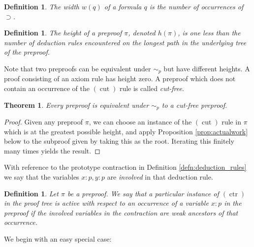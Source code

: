 \documentclass[english,letter paper,12pt,leqno]{article}
\newtheorem{thm}[theorem]{Theorem}
\theoremstyle{example}
\newtheorem{definition}[theorem]{Definition}
\numberwithin{equation}{section}
\def\imp{\supset}
\begin{document}
\begin{definition}
The \emph{width} $w(q)$ of a formula $q$ is the number of occurrences of $\imp$.
\end{definition}

\begin{definition}
The \emph{height} of a preproof $\pi$, denoted $h(\pi)$, is one less than the number of deduction rules encountered on the longest path in the underlying tree of the preproof.
\end{definition}

Note that two preproofs can be equivalent under $\sim_p$ but have different heights. A proof consisting of an axiom rule has height zero. A preproof which does not contain an occurrence of the $(\operatorname{cut})$ rule is called \emph{cut-free}.

\begin{thm}
\label{cutfree}
Every preproof is equivalent under $\sim_p$ to a cut-free preproof.
\end{thm}
\begin{proof}
Given any preproof $\pi$, we can choose an instance of the $(\operatorname{cut})$ rule in $\pi$ which is at the greatest possible height, and apply Proposition \ref{prop:actualwork} below to the subproof given by taking this as the root. Iterating this finitely many times yields the result.
\end{proof}

With reference to the prototype contraction in Definition \ref{defn:deduction_rules} we say that the variables $x:p, y:p$ are \emph{involved} in that deduction rule.

\begin{definition}\label{defn:active_contract} Let $\pi$ be a preproof. We say that a particular instance of $(\operatorname{ctr})$ in the proof tree is \emph{active} with respect to an occurrence of a variable $x:p$ in the preproof if the involved variables in the contraction are weak ancestors of that occurrence.
\end{definition}

We begin with an easy special case:
\end{document}
